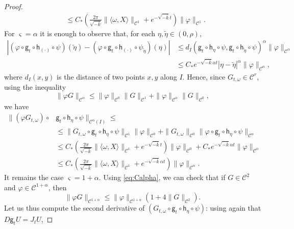 \documentclass[11pt,letterpaper]{amsart}
\newcommand \cC {{\mathscr{C}}}
\newcommand{\horo}{\mathsf{h}}
\newcommand{\geo}{\mathsf{g}}
\theoremstyle{definition}
\begin{document}
\begin{proof}
\begin{equation}
\begin{split}
&\le C_*\left(\frac{2\pi  }{\sqrt{-\overline k}}\|\langle \omega, X \rangle \|_{\cC^1} +e^{-\sqrt{-\overline k}t}\right)\|\varphi\|_{\cC^1}.
\end{split}
\end{equation}
For $\varsigma=\alpha$ it is enough to observe that, for each $\eta,\tilde \eta \in (0,\rho)$,
\begin{equation}\label{eq:Holder}
\begin{split}
|(\varphi \circ \geo_t\circ \horo_{(\cdot)}\circ \psi)(\tilde\eta)- (\varphi \circ \geo_t\circ \horo_{(\cdot)}\circ \psi_{\tilde\eta})(\eta)| 
&\le d_{I}(\geo_t\circ \horo_\eta\circ \psi,\geo_t\circ \horo_{\tilde \eta}\circ \psi )^{\alpha} \|\varphi\|_{\cC^\alpha}  \\
&\le C_* e^{-\sqrt{-\overline k} \alpha t}|\eta-\tilde \eta|^{\alpha}  \|\varphi\|_{\cC^\alpha},
\end{split}
\end{equation}
where $d_I(x,y)$ is the distance of two points $x,y$ along $I$. Hence, since $G_{t,\omega}\in \cC^r$, using the inequality
\begin{equation}\label{eq:Calpha}
\|\varphi G\|_{\cC^\alpha} \le \|\varphi\|_{\cC^0}\|G\|_{\cC^1}+\|\varphi\|_{\cC^\alpha}\|G\|_{\cC^0},
\end{equation}
we have
\[
\begin{split}
\|(\varphi G_{t,\omega})\circ & \geo_t\circ \horo_\eta\circ \psi \|_{\cC^\alpha(I)}\le \\
&\le \|G_{t,\omega}\circ \geo_t\circ \horo_\eta\circ \psi\|_{\cC^1}\|\varphi\|_{\cC^0}+\|G_{t,\omega}\|_{\cC^0}\|\varphi\circ \geo_t\circ \horo_\eta\circ \psi\|_{\cC^{\alpha}}\\
&\le  C_*\left(\frac{2\pi }{\sqrt{-\overline k}}\|\langle \omega, X \rangle \|_{\cC^1} +e^{-\sqrt{-\overline k}t}\right)\|\varphi\|_{\cC^0}+C_* e^{-\sqrt{-\overline k} \alpha t}  \|\varphi\|_{\cC^\alpha}\\
&\le C_*\left(\frac{2\pi }{\sqrt{-\overline k}}\|\langle \omega, X \rangle \|_{\cC^1} + e^{-\sqrt{-\overline k} \alpha t}  \right) \|\varphi\|_{\cC^\alpha}.
\end{split}
\]
It remains the case $\varsigma=1+\alpha$. Using \eqref{eq:Calpha}, we can check that if $G\in \cC^2$ and $\varphi \in \cC^{1+\alpha}$, then 
\begin{equation}\label{eq:C1+}
\|\varphi G\|_{\cC^{1+\alpha}}\le  \|\varphi\|_{\cC^{1+\alpha}}(1+4\|G\|_{\cC^{2}}).
\end{equation}
 Let us thus compute the second derivative of $(G_{t,\omega}\circ \geo_t\circ \horo_\eta \circ \psi)$: using again that $D\geo_tU=J_t U$,

\end{proof}
\end{document}
